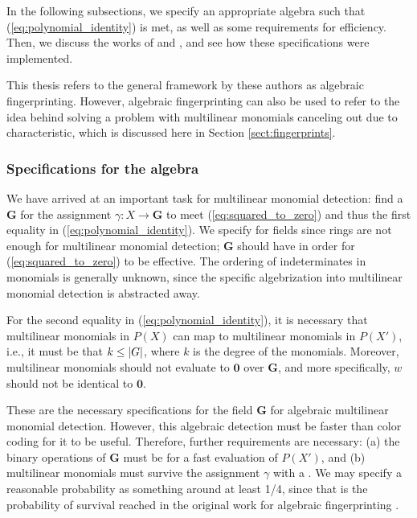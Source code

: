 In the following subsections, we specify an appropriate algebra such that 
(\ref{eq:polynomial_identity}) is met, as well as some requirements for efficiency. 
Then, we discuss the works of \citeauthor{Koutis08} and \citeauthor{Williams09} \cite{Koutis08, Williams09}, 
and see how these specifications were implemented.

This thesis refers to the general framework \cite{KouWil09, KouWil15} by these 
authors as algebraic fingerprinting. However, algebraic fingerprinting can also 
be used to refer to the idea behind solving a problem 
with multilinear monomials canceling out due to characteristic, 
which is discussed here in Section \ref{sect:fingerprints}.

\subsubsection{Specifications for the algebra}
\label{sect:algebra_specs}

We have arrived at an important task for multilinear monomial detection: 
find a  $\mathbf{G}$ for 
the assignment $\gamma \colon X \to \mathbf{G}$ to meet 
(\ref{eq:squared_to_zero}) and thus the first equality in (\ref{eq:polynomial_identity}). 
We specify for fields since rings are not enough for multilinear monomial detection; 
$\mathbf{G}$ should have
 in order for (\ref{eq:squared_to_zero}) 
to be effective. The ordering of indeterminates in monomials is generally unknown, 
since the specific algebrization into multilinear monomial detection 
is abstracted away. %

For the second equality in (\ref{eq:polynomial_identity}), it is necessary that multilinear 
monomials in $P(X)$ can map to multilinear monomials in $P(X')$, i.e., it must
be that 
$k \leq {\left\vert G\right\vert}$, where $k$ is the degree of the monomials. 
Moreover, multilinear monomials 
should not evaluate to $\mathbf{0}$ over $\mathbf{G}$, and more specifically, 
$w$ should not be identical to $\mathbf{0}$.

These are the necessary specifications for the field $\mathbf{G}$ for algebraic multilinear monomial detection. 
However, this algebraic detection must be faster than color coding for it to be useful. 
Therefore, further requirements are necessary: (a) the binary operations of $\mathbf{G}$ 
must be
for a fast evaluation of $P(X')$, and (b) multilinear monomials must 
survive the assignment $\gamma$ with a
. 
We may specify a reasonable probability as something around at least 1/4, since that is 
the probability of survival reached in the original work for algebraic fingerprinting \cite{Koutis08}.

